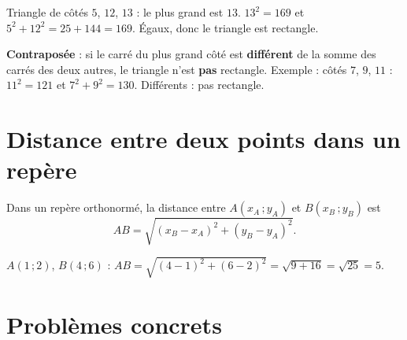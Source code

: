 \begin{exemple}
Triangle de côtés $5$, $12$, $13$ : le plus grand est $13$. $13^{2}=169$ et
$5^{2}+12^{2}=25+144=169$. Égaux, donc le triangle est rectangle.
\end{exemple}

\begin{remarque}
\textbf{Contraposée} : si le carré du plus grand côté est \textbf{différent} de la somme des
carrés des deux autres, le triangle n'est \textbf{pas} rectangle. Exemple : côtés $7$, $9$,
$11$ : $11^{2}=121$ et $7^{2}+9^{2}=130$. Différents : pas rectangle.
\end{remarque}

\section{Distance entre deux points dans un repère}

\begin{propriete}
Dans un repère orthonormé, la distance entre $A(x_A\,;y_A)$ et $B(x_B\,;y_B)$ est
\[
AB=\sqrt{(x_B-x_A)^{2}+(y_B-y_A)^{2}}.
\]
\end{propriete}

\begin{illus}
\end{illus}

\begin{exemple}
$A(1\,;2)$, $B(4\,;6)$ : $AB=\sqrt{(4-1)^{2}+(6-2)^{2}}=\sqrt{9+16}=\sqrt{25}=5$.
\end{exemple}

\section{Problèmes concrets}

